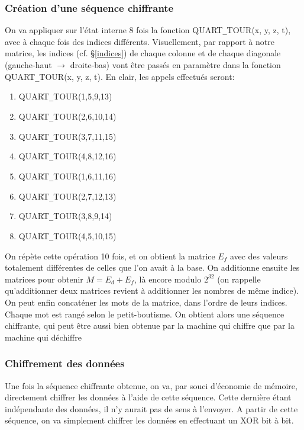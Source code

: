 \subsubsection{Création d'une séquence chiffrante}
On va appliquer sur l'état interne 8 fois la fonction {\ttfamily QUART\verb|_|TOUR(x, y, z, t)}, avec à chaque fois des indices différents. Visuellement, par rapport à notre matrice, les indices (cf. §\ref{indices}) de chaque colonne et de chaque diagonale (gauche-haut $\rightarrow$ droite-bas) vont être passés en paramètre dans la fonction {\ttfamily QUART\verb|_|TOUR(x, y, z, t)}. En clair, les appels effectués seront: 
\begin{enumerate}
    \item {\ttfamily QUART\verb|_|TOUR(1,5,9,13)}
    \item {\ttfamily QUART\verb|_|TOUR(2,6,10,14)}
    \item {\ttfamily QUART\verb|_|TOUR(3,7,11,15)}
    \item {\ttfamily QUART\verb|_|TOUR(4,8,12,16)}
    \item {\ttfamily QUART\verb|_|TOUR(1,6,11,16)}
    \item {\ttfamily QUART\verb|_|TOUR(2,7,12,13)}
    \item {\ttfamily QUART\verb|_|TOUR(3,8,9,14)}
    \item {\ttfamily QUART\verb|_|TOUR(4,5,10,15)}
\end{enumerate}
On répète cette opération 10 fois, et on obtient la matrice $E_f$ avec des valeurs totalement différentes de celles que l'on avait à la base. On additionne ensuite les matrices pour obtenir $M= E_d+E_f$, là encore modulo $2^{32}$ (on rappelle qu'additionner deux matrices revient à additionner les nombres de même indice).
On peut enfin concaténer les mots de la matrice, dans l'ordre de leurs indices. Chaque mot est rangé selon le petit-boutisme. On obtient alors une séquence chiffrante, qui peut être aussi bien obtenue par la machine qui chiffre que par la machine qui déchiffre \cite{nir_chacha20_2015} \\

\subsubsection{Chiffrement des données}
Une fois la séquence chiffrante obtenue, on va, par souci d'économie de mémoire, directement chiffrer les données à l'aide de cette séquence. Cette dernière étant indépendante des données, il n'y aurait pas de sens à l'envoyer. A partir de cette séquence, on va simplement chiffrer les données en effectuant un XOR bit à bit. \\

